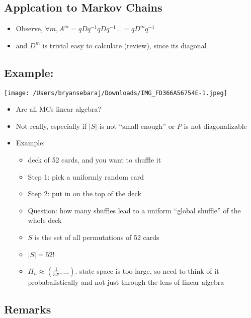 \documentclass{article}
\begin{document}
\subsection{Applcation to Markov Chains}

\begin{itemize}
    \item Observe, $\forall m, A^m = q D q^{-1} q D q^{-1} ... = q D^m q^{-1}$
    \item and $D^m$ is trivial easy to calculate (review), since its diagonal
\end{itemize}

\subsection{Example: }

\texttt{[image: /Users/bryansebaraj/Downloads/IMG\_FD366A56754E-1.jpeg]}

\begin{itemize}
    \item Are all MCs linear algebra?
    \item Not really, especially if $|S|$ is not ``small enough'' or $P$ is not diagonalizable
    \item Example: 
    \begin{itemize}
        \item deck of 52 cards, and you want to shuffle it
        \item Step 1: pick a uniformly random card
        \item Step 2: put in on the top of the deck
        \item Question: how many shuffles lead to a uniform ``global shuffle'' of the whole deck
        \item $S$ is the set of all permutations of 52 cards
        \item $|S|=52!$
        \item $\Pi_n \approx (\frac{1}{52!}, ...)$. state space is too large, so need to think of it probabalistically and not just through the lens of linear algebra
    \end{itemize}
\end{itemize}

\subsection{Remarks}
\end{document}
